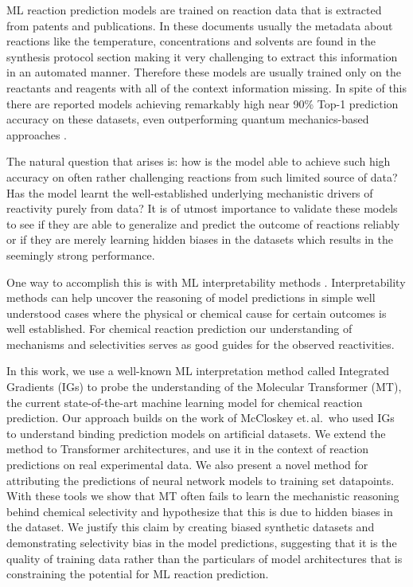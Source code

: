 ML reaction prediction models are trained on reaction data that is extracted from patents and publications. In these documents usually the metadata about reactions like the temperature, concentrations and solvents are found in the synthesis protocol section making it very challenging to extract this information in an automated manner. Therefore these models are usually trained only on the reactants and reagents with all of the context information missing. In spite of this there are reported models achieving remarkably high near 90\% Top-1 prediction accuracy on these datasets, even outperforming quantum mechanics-based approaches \cite{Schwaller2019MolecularPrediction}. 

The natural question that arises is: how is the model able to achieve such high accuracy on often rather challenging reactions from such limited source of data? Has the model learnt the well-established underlying mechanistic drivers of reactivity purely from data? It is of utmost importance to validate these models to see if they are able to generalize and predict the outcome of reactions reliably or if they are merely learning hidden biases in the datasets which results in the seemingly strong performance. 

One way to accomplish this is with ML interpretability methods \cite{Alvarez-Melis2018OnMethods}. Interpretability methods can help uncover the reasoning of model predictions in simple well understood cases where the physical or chemical cause for certain outcomes is well established. For chemical reaction prediction our understanding of mechanisms and selectivities serves as good guides for the observed reactivities.

In this work, we use a well-known ML interpretation method called Integrated Gradients (IGs) to probe the understanding of the Molecular Transformer (MT), the current state-of-the-art machine learning model for chemical reaction prediction. Our approach builds on the work of McCloskey et.\,al.\,\cite{McCloskey2019UsingChemistry} who used IGs to understand binding prediction models on artificial datasets. We extend the method to Transformer architectures, and use it in the context of reaction predictions on real experimental data. We also present a novel method for attributing the predictions of neural network models to training set datapoints. With these tools we show that MT often fails to learn the mechanistic reasoning behind chemical selectivity and hypothesize that this is due to hidden biases in the dataset. We justify this claim by creating biased synthetic datasets and demonstrating selectivity bias in the model predictions, suggesting that it is the quality of training data rather than the particulars of model architectures that is constraining the potential for ML reaction prediction.

